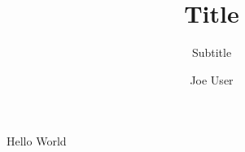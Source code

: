 \documentclass{beamer}
\institute{Universität Bielefeld}
\title{Title}
\subtitle{Subtitle}
\author{Joe User}
\begin{document}
\begin{frame}
\titlepage
\end{frame}

\begin{frame}{Hello}
World
\end{frame}
\end{document}
